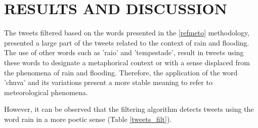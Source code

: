 
\chapter{RESULTS AND DISCUSSION} \label{MatMet}

The tweets filtered based on the words presented in the \ref{refmeto} methodology, presented a large part of the tweets related to the context of rain and flooding. The use of other words such as 'raio' and 'tempestade', result in tweets using these words to designate a metaphorical context or with a sense displaced from the phenomena of rain and flooding. Therefore, the application of the word 'chuva' and its variations present a more stable meaning to refer to meteorological phenomena.

However, it can be observed that the filtering algorithm detects tweets using the word rain in a more poetic sense (Table \ref{tweets_filt}).

